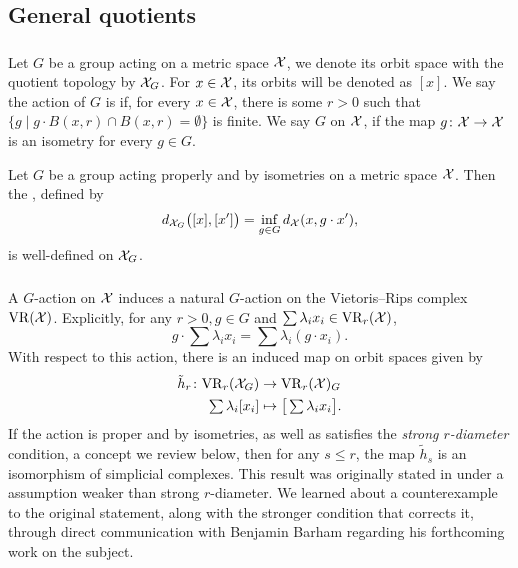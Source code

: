 
\subsection{General quotients}

\subsubsection{}

Let $G$ be a group acting on a metric space $\mathcal{X}$, we denote its orbit space with the quotient topology by $\mathcal{X}_G$.
For $x \in \mathcal{X}$, its orbits will be denoted as $[x]$.
We say the action of $G$ is  if, for every $x \in \mathcal{X}$, there is some $r>0$ such that $\{g \mid g\cdot B(x,r) \cap B(x,r) = \emptyset\}$ is finite.
We say $G$  on $\mathcal{X}$, if the map $g \colon \mathcal{X} \to \mathcal{X}$ is an isometry for every $g \in G$.

Let $G$ be a group acting properly and by isometries on a metric space $\mathcal{X}$.
Then the , defined by
\[
d_{\mathcal{X}_G}\big([x], [x']\big) = \inf_{g \in G} d_{\mathcal{X}}(x, g \cdot x'),
\]
is well-defined on $\mathcal{X}_G$.

\subsubsection{}\label{ss:h}

A \(G\)-action on $\mathcal{X}$ induces a natural \(G\)-action on the Vietoris--Rips complex $\mathrm{VR}(\mathcal{X})$.
Explicitly, for any \(r > 0, g\in G\) and $\sum \lambda_i x_i \in \mathrm{VR}_r(\mathcal{X})$,
\[
g \cdot \sum \lambda_i x_i = \sum \lambda_i (g\cdot x_i).
\]
With respect to this action, there is an induced map on orbit spaces given by
\begin{align*}
	\tilde h_r \colon \mathrm{VR}_r(\mathcal{X}_G) &\to \mathrm{VR}_r(\mathcal{X})_G \\
	\textstyle\sum\lambda_i [x_i] &\mapsto \textstyle \big[\sum\lambda_i x_i\big].
\end{align*}
If the action is proper and by isometries, as well as satisfies the \textit{strong \(r\)-diameter} condition, a concept we review below, then for any \(s \leq r\), the map $\tilde{h}_s$ is an isomorphism of simplicial complexes.
This result was originally stated in \cite[Prop.~3.5]{adams2022metric} under a assumption weaker than strong \(r\)-diameter.
We learned about a counterexample to the original statement, along with the stronger condition that corrects it, through direct communication with Benjamin Barham regarding his forthcoming work on the subject.

